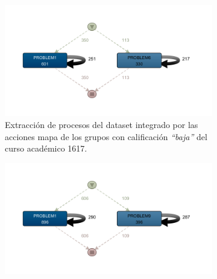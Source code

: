 \begin{figure}[H]
  \begin{subfigure}[t]{0.60\textwidth}
    \includegraphics[width=1.10\textwidth, height=0.80\textwidth]{imagenes/DISCO_map/Dataset FusionadoYear1617WorstGrades.png}
    \caption{Extracción de procesos del dataset integrado por las acciones mapa de los grupos con calificación \emph{``baja''} del curso académico 1617.}
    \label{fig:mapYear1617WorstGrades}
  \end{subfigure}
  \hfill
  \begin{subfigure}[t]{0.60\textwidth}
    \includegraphics[width=1.10\textwidth, height=0.80\textwidth]{imagenes/DISCO_map/Dataset FusionadoYear1718WorstGrades.png}

\end{subfigure}
\end{figure}
